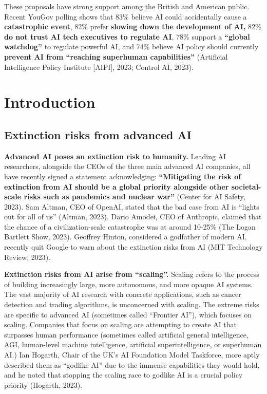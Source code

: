 \documentclass[12pt,a4paper]{article}
\begin{document}
These proposals have strong support among the British and American public. Recent YouGov polling shows that 83\% believe AI could accidentally cause a \textbf{catastrophic event}, 82\% prefer \textbf{slowing down the development of AI,} 82\% \textbf{do not trust AI tech executives to regulate AI}, 78\% support a \textbf{“global watchdog”} to regulate powerful AI, and 74\% believe AI policy should currently \textbf{prevent AI from “reaching superhuman capabilities”} (Artificial Intelligence Policy Institute [AIPI], 2023; Control AI, 2023).


\newpage
\section{Introduction}\label{sec:intro}
\subsection{Extinction risks from advanced AI} 
\textbf{Advanced AI poses an extinction risk to humanity.} Leading AI researchers, alongside the CEOs of the three main advanced AI companies, all have recently signed a statement acknowledging: \textbf{“Mitigating the risk of extinction from AI should be a global priority alongside other societal-scale risks such as pandemics and nuclear war”} (Center for AI Safety, 2023). Sam Altman, CEO of OpenAI, stated that the bad case from AI is “lights out for all of us” (Altman, 2023). Dario Amodei, CEO of Anthropic, claimed that the chance of a civilization-scale catastrophe was at around 10-25\% (The Logan Bartlett Show, 2023). Geoffrey Hinton, considered a godfather of modern AI, recently quit Google to warn about the extinction risks from AI (MIT Technology Review, 2023). 

\textbf{Extinction risks from AI arise from “scaling”.} Scaling refers to the process of building increasingly large, more autonomous, and more opaque AI systems. The vast majority of AI research with concrete applications, such as cancer detection and trading algorithms, is unconcerned with scaling. The extreme risks are specific to advanced AI (sometimes called “Frontier AI”), which focuses on scaling. Companies that focus on scaling are attempting to create AI that surpasses human performance (sometimes called artificial general intelligence, AGI, human-level machine intelligence, artificial superintelligence, or superhuman AI.) Ian Hogarth, Chair of the UK’s AI Foundation Model Taskforce, more aptly described them as “godlike AI” due to the immense capabilities they would hold, and he noted that stopping the scaling race to godlike AI is a crucial policy priority (Hogarth, 2023).
\end{document}
